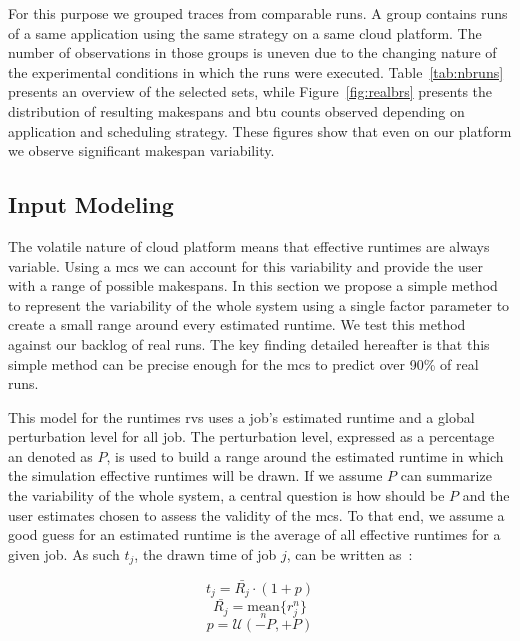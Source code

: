 \documentclass[10pt,conference,compsocconf]{IEEEtran}
\begin{document}
For this purpose we grouped traces  from comparable runs.  A group contains runs
of a  same application  using the same  strategy on a  same cloud  platform. The
number of observations in  those groups is uneven due to  the changing nature of
the    experimental   conditions    in   which    the   runs    were   executed.
Table~\ref{tab:nbruns}  presents  an  overview   of  the  selected  sets,  while
Figure~\ref{fig:realbrs} presents the distribution of resulting makespans and
\ac{btu} counts observed depending on application and scheduling strategy. These
figures show that even on our platform we observe significant makespan
variability.

\subsection{Input Modeling}\label{sec:im}

The volatile nature  of cloud platform means that effective  runtimes are always
variable. Using a  \ac{mcs} we can account for this  variability and provide the
user with  a range of  possible makespans. In this  section we propose  a simple
method to  represent the variability of  the whole system using  a single factor
parameter to create  a small range around every estimated  runtime. We test this
method against our backlog of real  runs.  The key finding detailed hereafter is
that this simple method  can be precise enough for the  \ac{mcs} to predict over
90\% of real runs.

This model for the runtimes \acp{rv} uses a job's estimated runtime and a global
perturbation  level  for  all  job.   The perturbation  level,  expressed  as  a
percentage an  denoted as  $P$, is used  to build a  range around  the estimated
runtime in which the simulation effective  runtimes will be drawn. If we assume
$P$ can summarize the variability of the whole system, a central question is how
should  be $P$  and the  user estimates  chosen to  assess the  validity of  the
\ac{mcs}.
To that  end, we assume a  good guess for an estimated  runtime is the
average of all effective runtimes for a given job. As such $t_j$, the drawn time
of job $j$, can be written as~:

\begin{equation}
	t_j = \bar{R_j} \cdot (1 + p)
	\label{eq:t}
\end{equation}
\begin{equation}
	\bar{R_j} = \underset{n}{\textrm{mean}}\{r_j^n\}
\end{equation}
\begin{equation}
	p = \mathcal{U}(-P,+P)
	\label{eq:r}
\end{equation}
\end{document}
